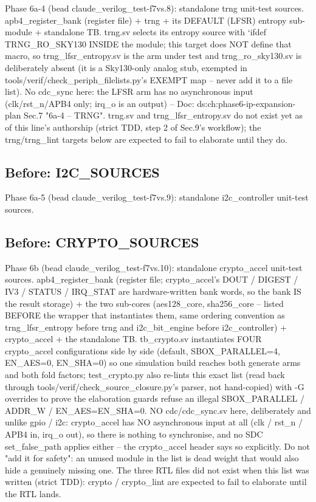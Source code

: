 \begin{record}
\begin{textblock}
Phase 6a-4 (bead claude_verilog_test-f7vs.8): standalone trng unit-test sources.
apb4_register_bank (register file) + trng + its DEFAULT (LFSR) entropy sub-module + standalone
TB. trng.sv selects its entropy source with `ifdef TRNG_RO_SKY130 INSIDE the module; this target
does NOT define that macro, so trng_lfsr_entropy.sv is the arm under test and
trng_ro_sky130.sv is deliberately absent (it is a Sky130-only analog stub, exempted in
tools/verif/check_periph_filelists.py's EXEMPT map -- never add it to a file list). No
cdc_sync here: the LFSR arm has no asynchronous input (clk/rst_n/APB4 only; irq_o is an
output) -- Doc: ds:ch:phase6-ip-expansion-plan Sec.7 "6a-4 -- TRNG". trng.sv and
trng_lfsr_entropy.sv do not exist yet as of this line's authorship (strict TDD, step 2 of
Sec.9's workflow); the trng/trng_lint targets below are expected to fail to elaborate until they
do.
\end{textblock}

\subsection*{Before: I2C\_SOURCES}

\begin{textblock}
Phase 6a-5 (bead claude_verilog_test-f7vs.9): standalone i2c_controller unit-test sources.
\end{textblock}

\subsection*{Before: CRYPTO\_SOURCES}

\begin{textblock}
Phase 6b (bead claude_verilog_test-f7vs.10): standalone crypto_accel unit-test sources.
apb4_register_bank (register file; crypto_accel's DOUT / DIGEST / IV3 / STATUS / IRQ_STAT are
hardware-written bank words, so the bank IS the result storage) + the two sub-cores
(aes128_core, sha256_core -- listed BEFORE the wrapper that instantiates them, same ordering
convention as trng_lfsr_entropy before trng and i2c_bit_engine before i2c_controller) +
crypto_accel + the standalone TB. tb_crypto.sv instantiates FOUR crypto_accel configurations
side by side (default, SBOX_PARALLEL=4, EN_AES=0, EN_SHA=0) so one simulation build reaches both
generate arms and both fold factors; test_crypto.py also re-lints this exact list (read back
through tools/verif/check_source_closure.py's parser, not hand-copied) with -G overrides to
prove the elaboration guards refuse an illegal SBOX_PARALLEL / ADDR_W / EN_AES=EN_SHA=0.
NO cdc/cdc_sync.sv here, deliberately and unlike gpio / i2c: crypto_accel has NO
asynchronous input at all (clk / rst_n / APB4 in, irq_o out), so there is nothing to
synchronise, and no SDC set_false_path applies either -- the crypto_accel header says so
explicitly. Do not "add it for safety": an unused module in the list is dead weight that would
also hide a genuinely missing one. The three RTL files did not exist when this list was written
(strict TDD): crypto / crypto_lint are expected to fail to elaborate until the RTL lands.
\end{textblock}


\end{record}
